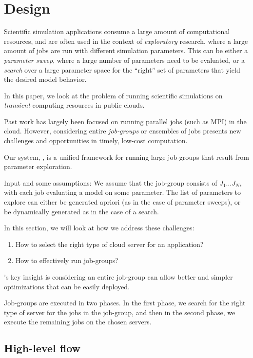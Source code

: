 \section{\sysname Design}

Scientific simulation applications consume a large amount of computational resources, and are often used in the context of \emph{exploratory} research, where a large amount of jobs are run with  different simulation parameters.
This can be either a \emph{parameter sweep}, where a large number of parameters need to be evaluated, or a \emph{search} over a large parameter space for the ``right'' set of parameters that yield the desired model behavior.

In this paper, we look at the problem of running scientific simulations on \emph{transient} computing resources in public clouds. 


Past work has largely been focused on running parallel jobs (such as MPI) in the cloud. 
However, considering entire \emph{job-groups} or ensembles of jobs presents new challenges and opportunities in timely, low-cost computation.

Our system, \sysname, is a unified framework for running large job-groups that result from parameter exploration. 

Input and some assumptions:
We assume that the job-group consists of $J_1\ldots J_N$, with each job evaluating a model on some parameter.
The list of parameters to explore can either be generated apriori (as in the case of parameter sweeps), or be dynamically generated as in the case of a search.

In this section, we will look at how we address these challenges:
\begin{enumerate}
\item How to select the right type of cloud server for an application?
\item How to effectively run job-groups?
\end{enumerate}

\sysname's key insight is considering an entire job-group can allow better and simpler optimizations that can be easily deployed. 

Job-groups are executed in two phases.
In the first phase, we search for the right type of server for the jobs in the job-group, and then in the second phase, we execute the remaining jobs on the chosen servers.

\subsection{High-level flow}

